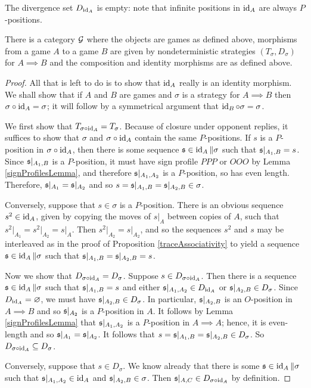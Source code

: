 \documentclass{article}
\begin{document}
The divergence set $D_{\operatorname{id}_A}$ is empty: note that infinite positions in $\operatorname{id}_A$ are always $P$-positions.

\begin{theorem}
  There is a category $\mathcal G$ where the objects are games as defined above, morphisms from a game $A$ to a game $B$ are given by nondeterministic strategies $(T_\sigma, D_\sigma)$ for $A\implies B$ and the composition and identity morphisms are as defined above.
  \begin{proof}
    All that is left to do is to show that $\operatorname{id}_A$ really is an identity morphism.  We shall show that if $A$ and $B$ are games and $\sigma$ is a strategy for $A\implies B$ then $\sigma \circ \operatorname{id}_A=\sigma$; it will follow by a symmetrical argument that $\operatorname{id}_B \circ \sigma = \sigma$.

    We first show that $T_{\sigma \circ \operatorname{id}_A}=T_\sigma$.  Because of closure under opponent replies, it suffices to show that $\sigma$ and $\sigma \circ \operatorname{id}_A$ contain the same $P$-positions.  If $s$ is a $P$-position in $\sigma \circ \operatorname{id}_A$, then there is some sequence $\mathfrak s\in\operatorname{id}_A\|\sigma$ such that $\mathfrak s\vert_{A_1,B}=s$.  Since $\mathfrak s\vert_{A_1,B}$ is a $P$-position, it must have sign profile $PPP$ or $OOO$ by Lemma \ref{signProfilesLemma}, and therefore $\mathfrak s\vert_{A_1,A_2}$ is a $P$-position, so has even length.  Therefore, $\mathfrak s\vert_{A_1}=\mathfrak s\vert_{A_2}$ and so $s=\mathfrak s\vert_{A_1,B}=\mathfrak s\vert_{A_2,B}\in\sigma$.

    Conversely, suppose that $s\in\sigma$ is a $P$-position.  There is an obvious sequence $s^2\in\operatorname{id}_A$, given by copying the moves of $s\vert_A$ between copies of $A$, such that $s^2\vert_{A_1}=s^2\vert_{A_2}=s\vert_A$.  Then $s^2\vert_{A_2}=s\vert_{A_2}$, and so the sequences $s^2$ and $s$ may be interleaved as in the proof of Proposition \ref{traceAssociativity} to yield a sequence $\mathfrak s\in\operatorname{id}_A\|\sigma$ such that $\mathfrak s\vert_{A_1,B}=\mathfrak s\vert_{A_2,B}=s$.  

    Now we show that $D_{\sigma \circ \operatorname{id}_A}=D_\sigma$.  Suppose $s\in D_{\sigma \circ \operatorname{id}_A}$.  Then there is a sequence $\mathfrak s\in\operatorname{id}_A\|\sigma$ such that $\mathfrak s\vert_{A_1,B}=s$ and either $\mathfrak s\vert_{A_1,A_2}\in D_{\operatorname{id}_A}$ or $\mathfrak s\vert_{A_2,B}\in D_\sigma$.  Since $D_{\operatorname{id}_A}=\varnothing$, we must have $\mathfrak s\vert_{A_2,B}\in D_\sigma$.  In particular, $\mathfrak s\vert_{A_2,B}$ is an $O$-position in $A\implies B$ and so $\mathfrak s\vert_{A_2}$ is a $P$-position in $A$.  It follows by Lemma \ref{signProfilesLemma} that $\mathfrak s\vert_{A_1,A_2}$ is a $P$-position in $A\implies A$; hence, it is even-length and so $\mathfrak s\vert_{A_1}=\mathfrak s\vert_{A_2}$.  It follows that $s=\mathfrak s\vert_{A_1,B}=\mathfrak s\vert_{A_2,B}\in D_\sigma$.  So $D_{\sigma \circ \operatorname{id}_A}\subseteq D_\sigma$.  

    Conversely, suppose that $s\in D_\sigma$.  We know already that there is some $\mathfrak s\in\operatorname{id}_A\|\sigma$ such that $\mathfrak s\vert_{A_1,A_2}\in\operatorname{id}_A$ and $\mathfrak s\vert_{A_2,B}\in\sigma$.  Then $\mathfrak s\vert_{A,C}\in D_{\sigma \circ \operatorname{id}_A}$ by definition.
  \end{proof}
\end{theorem}
\end{document}
